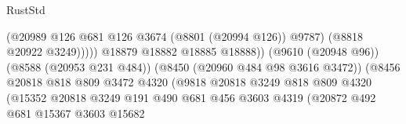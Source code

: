 \begin{lexlean}{RustStd}
\begin{coremodule}
                                                            (@20989
                                                              @126
                                                              @681
                                                              @126
                                                              @3674
                                                              (@8801 (@20994 @126))
                                                              @9787)
                                                            (@8818 @20922 @3249)))))
                                                    @18879
                                                    @18882
                                                    @18885
                                                    @18888))
                                                (@9610 (@20948 @96))
                                                (@8588 (@20953 @231 @484))
                                                (@8450 (@20960 @484 @98 @3616 @3472))
                                                (@8456
                                                  @20818
                                                  @818
                                                  @809
                                                  @3472
                                                  @4320
                                                  (@9818
                                                    @20818
                                                    @3249
                                                    @818
                                                    @809
                                                    @4320
                                                    (@15352
                                                      @20818
                                                      @3249
                                                      @191
                                                      @490
                                                      @681
                                                      @456
                                                      @3603
                                                      @4319
                                                      (@20872
                                                        @492
                                                        @681
                                                        @15367
                                                        @3603
                                                        @15682

\end{coremodule}
\end{lexlean}
